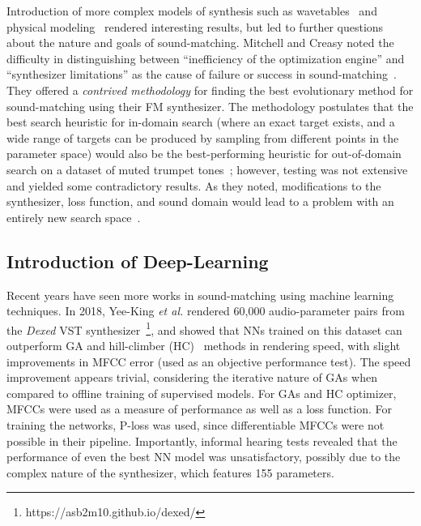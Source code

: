\documentclass[lettersize,journal]{IEEEtran}
\providecommand{\gls}[1]{#1}
\begin{document}

Introduction of more complex models of synthesis such as wavetables~\cite{horner2003auto} and physical modeling~\cite{riionheimo2003parameter} rendered interesting results, but led to further questions about the nature and goals of sound-matching. Mitchell and Creasy noted the difficulty in distinguishing between ``inefficiency of the optimization engine'' and ``synthesizer limitations'' as the cause of failure or success in sound-matching~\cite{mitchell2007evolutionary}. They offered a \textit{contrived methodology} for finding the best evolutionary method for sound-matching using their FM synthesizer. The methodology postulates that the best search heuristic for in-domain search (where an exact target exists, and a wide range of targets can be produced by sampling from different points in the parameter space) would also be the best-performing heuristic for out-of-domain search on a dataset of muted trumpet tones~\cite{opolko1989mcgill}; however, testing was not extensive and yielded some contradictory results. As they noted, modifications to the synthesizer, loss function, and sound domain would lead to a problem with an entirely new search space~\cite{mitchell2007evolutionary}. 

\subsection{Introduction of Deep-Learning}
Recent years have seen more works in sound-matching using machine learning techniques. In 2018, Yee-King \textit{et al.} rendered 60,000 audio-parameter pairs from the \textit{Dexed} \gls{VST} synthesizer~\footnote{https://asb2m10.github.io/dexed/}, and showed that NNs trained on this dataset can outperform GA and hill-climber (\gls{HC})~\cite{hoffmann2000heuristic} methods in rendering speed, with slight improvements in MFCC error (used as an objective performance test). The speed improvement appears trivial, considering the iterative nature of GAs when compared to offline training of supervised models. For GAs and HC optimizer, MFCCs were used as a measure of performance as well as a loss function. For training the networks, P-loss was used, since differentiable MFCCs were not possible in their pipeline. Importantly, informal hearing tests revealed that the performance of even the best NN model was unsatisfactory, possibly due to the complex nature of the synthesizer, which features 155 parameters.
\end{document}
